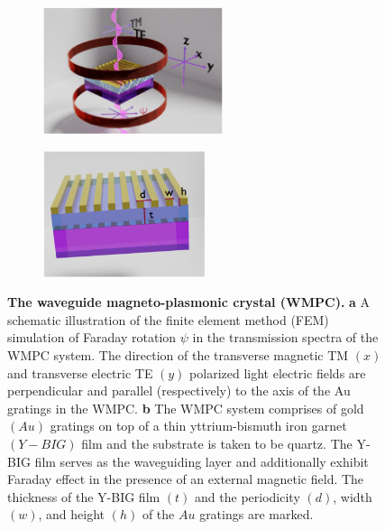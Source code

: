 \documentclass[13pt]{article}
\begin{document}
\begin{figure}[hbt!]
	\centering
	\begin{subfigure}[]{.49 \linewidth}
		\centering
		\includegraphics[width=\linewidth, height=140px]{Figures/figure1a.png}
		\caption{}
		\label{}
	\end{subfigure}
	\hfill
	\begin{subfigure}[]{.49 \linewidth}
		\centering
		\includegraphics[width=\linewidth, height=140px]{Figures/figure1b.png}
		\caption{}
		\label{}
	\end{subfigure}
	\caption{\textbf{The waveguide magneto-plasmonic crystal (WMPC).} \textbf{a} A schematic illustration of the finite element method (FEM) simulation of Faraday rotation $\psi$ in the transmission spectra of the WMPC system. The direction of the transverse magnetic TM $(x)$ and transverse electric TE $(y)$ polarized light electric fields are perpendicular and parallel (respectively) to the axis of the Au gratings in the WMPC. \textbf{b} The WMPC system comprises of gold $(Au)$ gratings on top of a thin yttrium-bismuth iron garnet $(Y-BIG)$ film and the substrate is taken to be quartz. The Y-BIG film serves as the waveguiding layer and additionally exhibit Faraday effect in the presence of an external magnetic field. The thickness of the Y-BIG film $(t)$ and the periodicity $(d)$, width $(w)$, and height $(h)$ of the $Au$ gratings are marked.}
	\label{fig:figure1}
\end{figure}
\FloatBarrier
\end{document}
